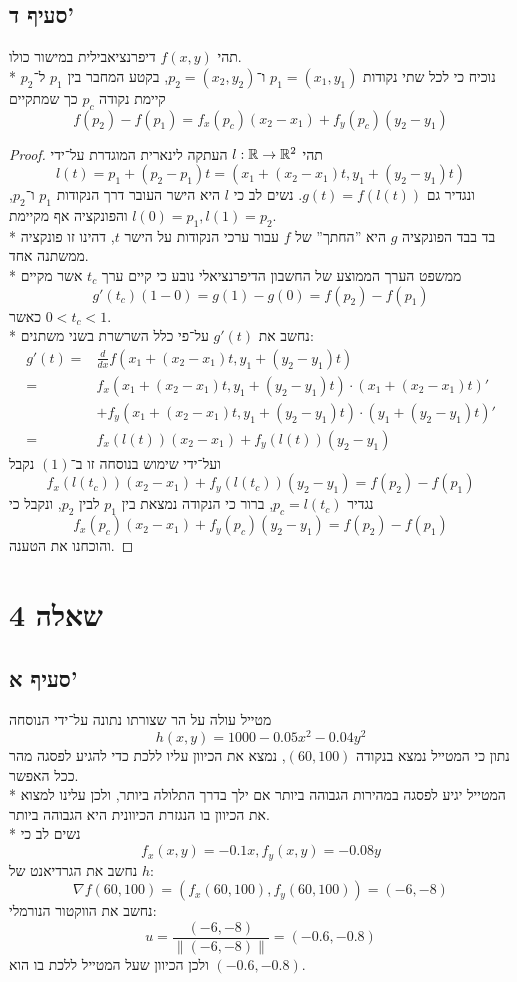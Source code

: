\subsection{סעיף ד'}
תהי $f(x, y)$ דיפרנציאבילית במישור כולו. \\*
נוכיח כי לכל שתי נקודות $p_1 = (x_1, y_1)$ ו־$p_2 = (x_2, y_2)$,
בקטע המחבר בין $p_1$ ל־$p_2$ קיימת נקודה $p_c$ כך שמתקיים
\[
	f(p_2) - f(p_1) = f_x(p_c) (x_2 - x_1) + f_y(p_c) (y_2 - y_1)
\]
\begin{proof}
	תהי $l : \mathbb{R} \to \mathbb{R}^2$ העתקה לינארית המוגדרת על־ידי
	\[
		l(t) = p_1 + (p_2 - p_1) t = (x_1 + (x_2 - x_1) t, y_1 + (y_2 - y_1) t)
	\]
	ונגדיר גם $g(t) = f(l(t))$.
	נשים לב כי $l$ היא הישר העובר דרך הנקודות $p_1$ ו־$p_2$, והפונקציה אף מקיימת $l(0) = p_1, l(1) = p_2$. \\*
	בד בבד הפונקציה $g$ היא ''החתך'' של $f$ עבור ערכי הנקודות על הישר $t$, דהינו זו פונקציה ממשתנה אחד. \\*
	ממשפט הערך הממוצע של החשבון הדיפרנציאלי נובע כי קיים ערך $t_c$ אשר מקיים
	\[
		g'(t_c) (1 - 0) = g(1) - g(0) = f(p_2) - f(p_1) \tag{1}
	\]
	כאשר $0 < t_c < 1$. \\*
	נחשב את $g'(t)$ על־פי כלל השרשרת בשני משתנים:
	\begin{align*}
		g'(t)
		= & \frac{d}{dx} f(x_1 + (x_2 - x_1)t, y_1 + (y_2 - y_1)t) \\
		= & f_x(x_1 + (x_2 - x_1)t, y_1 + (y_2 - y_1)t) \cdot (x_1 + (x_2 - x_1) t)' \\
		  & + f_y(x_1 + (x_2 - x_1)t, y_1 + (y_2 - y_1)t) \cdot (y_1 + (y_2 - y_1) t)' \\
		= & f_x(l(t)) (x_2 - x_1) + f_y(l(t)) (y_2 - y_1)
	\end{align*}
	ועל־ידי שימוש בנוסחה זו ב־$(1)$ נקבל
	\[
		f_x(l(t_c)) (x_2 - x_1) + f_y(l(t_c)) (y_2 - y_1) = f(p_2) - f(p_1)
	\]
	נגדיר $p_c = l(t_c)$, ברור כי הנקודה נמצאת בין $p_1$ לבין $p_2$, ונקבל כי
	\[
		f_x(p_c) (x_2 - x_1) + f_y(p_c) (y_2 - y_1) = f(p_2) - f(p_1)
	\]
	והוכחנו את הטענה.
\end{proof}

\section{שאלה 4}
\subsection{סעיף א'}
מטייל עולה על הר שצורתו נתונה על־ידי הנוסחה
\[
	h(x, y) = 1000 - 0.05 x^2 - 0.04 y^2
\]
נתון כי המטייל נמצא בנקודה $(60, 100)$, נמצא את הכיוון עליו ללכת כדי להגיע לפסגה מהר ככל האפשר. \\*
המטייל יגיע לפסגה במהירות הגבוהה ביותר אם ילך בדרך התלולה ביותר, ולכן עלינו למצוא את הכיוון בו הנגזרת הכיוונית היא הגבוהה ביותר. \\*
נשים לב כי
\[
	f_x(x, y) = -0.1x,
	f_y(x, y) = -0.08y
\]
נחשב את הגרדיאנט של $h$:
\[
	\nabla f(60, 100)
	= (f_x(60, 100), f_y(60, 100))
	= (-6, -8)
\]
נחשב את הווקטור הנורמלי:
\[
	u = \frac{(-6, -8)}{\lVert(-6, -8)\rVert} = (-0.6, -0.8)
\]
ולכן הכיוון שעל המטייל ללכת בו הוא $(-0.6, -0.8)$.

